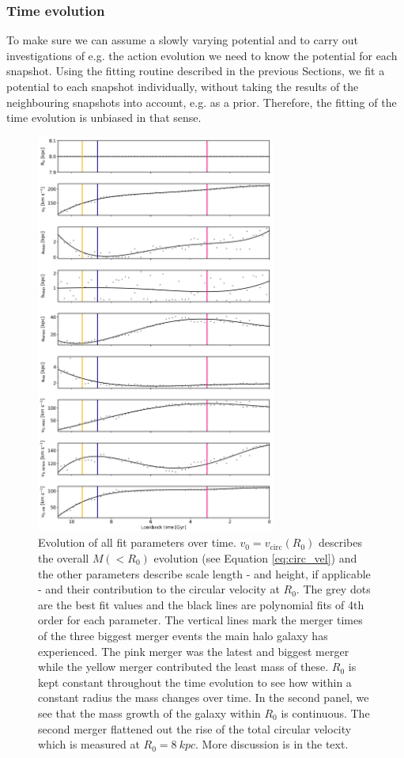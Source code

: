 \subsubsection{Time evolution}
To make sure we can assume a slowly varying potential and to carry out investigations of e.g. the action evolution we need to know the potential for each snapshot. Using the fitting routine described in the previous Sections, we fit a potential to each snapshot individually, without taking the results of the neighbouring snapshots into account, e.g. as a prior. Therefore, the fitting of the time evolution is unbiased in that sense. 
\begin{figure}%
\captionsetup{format=plain}
\centering
\includegraphics[width=0.7\textwidth]{plots/Auriga/fitted_potential_evolution_jan19.png}
\caption{Evolution of all fit parameters over time. $v_0 = v_\mathrm{circ}(R_0)$ describes the overall $M(<R_0)$ evolution (see Equation \ref{eq:circ_vel}) and the other parameters describe scale length - and height, if applicable - and their contribution to the circular velocity at $R_0$. The grey dots are the best fit values and the black lines are polynomial fits of 4th order for each parameter. The vertical lines mark the merger times of the three biggest merger events the main halo galaxy has experienced. The pink merger was the latest and biggest merger while the yellow merger contributed the least mass of these. $R_0$ is kept constant throughout the time evolution to see how within a constant radius the mass changes over time. In the second panel, we see that the mass growth of the galaxy within $R_0$ is continuous. The second merger flattened out the rise of the total circular velocity which is measured at $R_0 = \SI{8}{kpc}$. More discussion is in the text.}\label{fig:pot_val_evol}
\end{figure}
